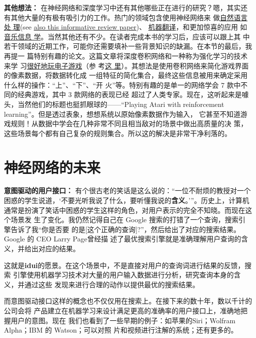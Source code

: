 \textbf{其他想法：} 在神经网络和深度学习中还有其他哪些正在进行的研究？嗯，其实还
有其他大量的有极有吸引力的工作。热门的领域包含使用神经网络来
做\href{http://machinelearning.org/archive/icml2008/papers/391.pdf}{自然语言处
  理}(see \href{http://arxiv.org/abs/1103.0398}{also
  this informative review
  paper})、
\href{http://papers.nips.cc/paper/5346-information-based-learning-by-agents-in-unbounded-state-spaces}{机器翻译}，和更加惊喜的应用
如\href{http://yann.lecun.com/exdb/publis/pdf/humphrey-jiis-13.pdf}{音乐信息
  学}。当然其他还有不少。在读者完成本书的学习后，应该可以跟上其
中若干领域的近期工作，可能你还需要填补一些背景知识的缺漏。在本节的最后，我再提一
篇特别有趣的论文。这篇文章将深度卷积网络和一种称为强化学习的技术来学
习\href{http://www.cs.toronto.edu/~vmnih/docs/dqn.pdf}{很好地玩电子游戏}（参
考\href{http://www.nature.com/nature/journal/v518/n7540/abs/nature14236.html}{这
  里}）。其想法是使用卷积网络来简化游戏界面的像素数据，将数据转化成
一组特征的简化集合，最终这些信息被用来确定采用什么样的操作：“上”、“下”、“开
火”等。特别有趣的是单一的网络学会 7 款中不同的经典游戏，其中 3 款网络的表现已经
超过了人类专家。现在，这听起来是噱头，当然他们的标题也挺抓眼球的——“Playing
Atari with reinforcement learning”。但是透过表象，想想系统以原始像素数据作为输入，
它甚至不知道游戏规则！从数据中学会在几种非常不同且相当敌对的场景中做出高质量的决
策，这些场景每个都有自己复杂的规则集合。所以这的解决是非常干净利落的。

\section{神经网络的未来}
\label{sec:on_the_future_of_neural_networks}

\textbf{意图驱动的用户接口：} 有个很古老的笑话是这么说的：“一位不耐烦的教授对一个
困惑的学生说道，‘不要光听我说了什么，要听懂我说的\textbf{含义}。’”。历史上，计算机
通常是扮演了笑话中困惑的学生这样的角色，对用户表示的完全不知晓。而现在这个场景发
生了变化。我仍然记得自己在 Google 搜索的打错了一个查询，搜索引擎告诉了我“你是否要
的是[这个正确的查询]?”，然后给出了对应的搜索结果。Google 的 CEO Larry Page曾经描
述了最优搜索引擎就是准确理解用户查询的含义，并给出对应的结果。

这就是\textbf{\gls{idui}}的愿景。在这个场景中，不是直接对用户的查询词进行结果的反馈，搜索
引擎使用机器学习技术对大量的用户输入数据进行分析，研究查询本身的含义，并通过这些
发现来进行合理的动作以提供最优的搜索结果。

而意图驱动接口这样的概念也不仅仅用在搜索上。在接下来的数十年，数以千计的公司会将
产品建立在机器学习来设计满足更高的准确率的用户接口上，准确地把握用户的意图。现在
我们也看到了一些早期的例子：如苹果的Siri；Wolfram Alpha；IBM 的 Watson；可以对照
片和视频进行注解的系统；还有更多的。

